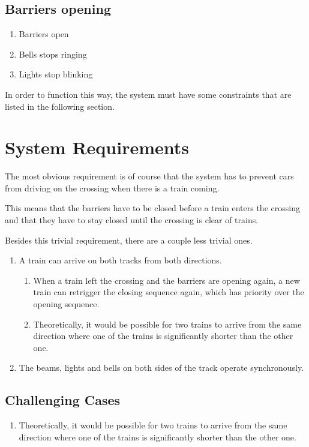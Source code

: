 \documentclass[final]{report}
\begin{document}
\subsection{Barriers opening}
\begin{enumerate}
\item Barriers open
\item Bells stops ringing
\item Lights stop blinking
\end{enumerate}

In order to function this way, the system must have some constraints that are listed in the following section. 

\section{System Requirements}
The most obvious requirement is of course that the system has to prevent cars from driving on the crossing when there is a train coming.

This means that the barriers have to be closed before a train enters the crossing and that they have to stay closed until the crossing is clear of trains.

Besides this trivial requirement, there are a couple less trivial ones.
\begin{enumerate}
\item A train can arrive on both tracks from both directions.
	\begin{enumerate}
	\item When a train left the crossing and the barriers are opening again, a new train can retrigger the closing sequence again, which has priority over the opening sequence. %
	\item Theoretically, it would be possible for two trains to arrive from the same direction where one of the trains is significantly shorter than the other one. %
	\end{enumerate}

\item The beams, lights and bells on both sides of the track operate synchronously.
\end{enumerate}


\subsection{Challenging Cases}
	\begin{enumerate}
		\item Theoretically, it would be possible for two trains to arrive from the same direction where one of the trains is significantly shorter than the other one.

	\end{enumerate}
\end{document}

